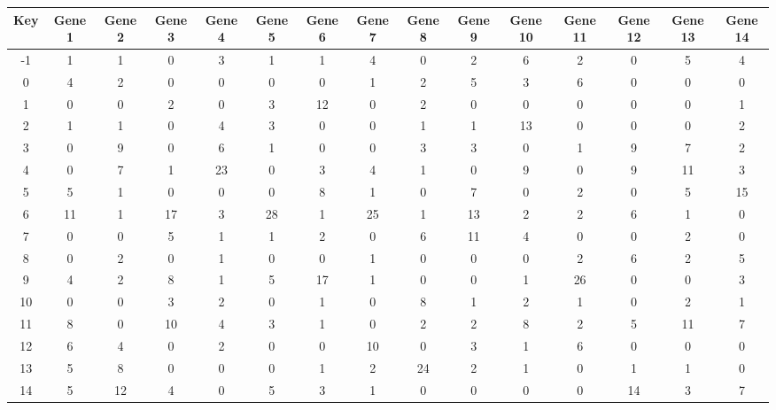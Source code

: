 \begin{tabular}{|c|c|c|c|c|c|c|c|c|c|c|c|c|c|c|}
\hline
Key & Gene 1 & Gene 2 & Gene 3 & Gene 4 & Gene 5 & Gene 6 & Gene 7 & Gene 8 & Gene 9 & Gene 10 & Gene 11 & Gene 12 & Gene 13 & Gene 14 \\
\hline
-1 & 1 & 1 & 0 & 3 & 1 & 1 & 4 & 0 & 2 & 6 & 2 & 0 & 5 & 4 \\
0 & 4 & 2 & 0 & 0 & 0 & 0 & 1 & 2 & 5 & 3 & 6 & 0 & 0 & 0 \\
1 & 0 & 0 & 2 & 0 & 3 & 12 & 0 & 2 & 0 & 0 & 0 & 0 & 0 & 1 \\
2 & 1 & 1 & 0 & 4 & 3 & 0 & 0 & 1 & 1 & 13 & 0 & 0 & 0 & 2 \\
3 & 0 & 9 & 0 & 6 & 1 & 0 & 0 & 3 & 3 & 0 & 1 & 9 & 7 & 2 \\
4 & 0 & 7 & 1 & 23 & 0 & 3 & 4 & 1 & 0 & 9 & 0 & 9 & 11 & 3 \\
5 & 5 & 1 & 0 & 0 & 0 & 8 & 1 & 0 & 7 & 0 & 2 & 0 & 5 & 15 \\
6 & 11 & 1 & 17 & 3 & 28 & 1 & 25 & 1 & 13 & 2 & 2 & 6 & 1 & 0 \\
7 & 0 & 0 & 5 & 1 & 1 & 2 & 0 & 6 & 11 & 4 & 0 & 0 & 2 & 0 \\
8 & 0 & 2 & 0 & 1 & 0 & 0 & 1 & 0 & 0 & 0 & 2 & 6 & 2 & 5 \\
9 & 4 & 2 & 8 & 1 & 5 & 17 & 1 & 0 & 0 & 1 & 26 & 0 & 0 & 3 \\
10 & 0 & 0 & 3 & 2 & 0 & 1 & 0 & 8 & 1 & 2 & 1 & 0 & 2 & 1 \\
11 & 8 & 0 & 10 & 4 & 3 & 1 & 0 & 2 & 2 & 8 & 2 & 5 & 11 & 7 \\
12 & 6 & 4 & 0 & 2 & 0 & 0 & 10 & 0 & 3 & 1 & 6 & 0 & 0 & 0 \\
13 & 5 & 8 & 0 & 0 & 0 & 1 & 2 & 24 & 2 & 1 & 0 & 1 & 1 & 0 \\
14 & 5 & 12 & 4 & 0 & 5 & 3 & 1 & 0 & 0 & 0 & 0 & 14 & 3 & 7 \\
\hline
\end{tabular}